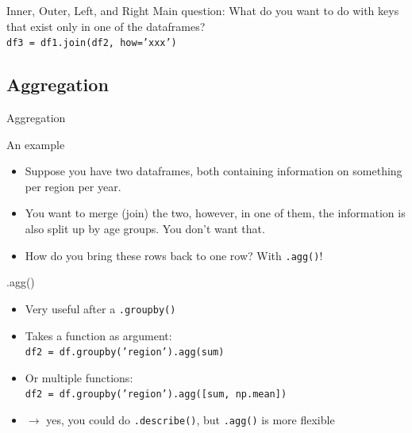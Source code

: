 \documentclass{beamer}
\begin{document}
\begin{frame}[fragile]{Inner, Outer, Left, and Right}
Main question: What do you want to do with keys that exist only in one of the  dataframes? \\
\pause
\vfill
\texttt{df3 = df1.join(df2, how='xxx')}\\
\vfill

\end{frame}



\subsection{Aggregation}
\begin{frame}[plain]
Aggregation
\end{frame}

\begin{frame}{An example}
\begin{itemize}
	\item Suppose you have two dataframes, both containing information on something  per region per year.
	\item 	You want to merge (join) the two, however, in one of them, the information is also split up by age groups. You don’t want that.
	\item 	How do you bring these rows back to one row? With \texttt{.agg()}!
\end{itemize}

\end{frame}


\begin{frame}{.agg()}
\begin{itemize}[<+->]
	\item Very useful after a \texttt{.groupby()}
	\item Takes a function as argument: \\	\texttt{df2 = df.groupby('region').agg(sum)}
	\item Or multiple functions: \\ \texttt{df2 = df.groupby('region').agg([sum, np.mean])}
	\item $\rightarrow$ yes, you could do \texttt{.describe()}, but \texttt{.agg()} is more flexible	
\end{itemize}
\end{frame}
\end{document}
